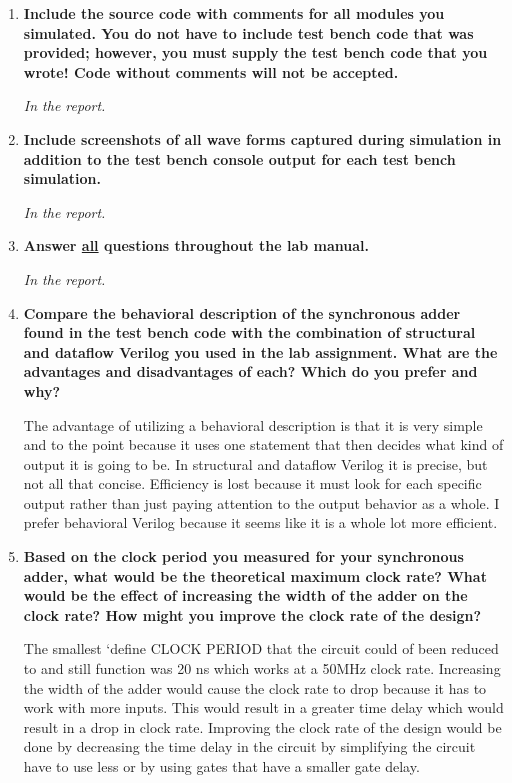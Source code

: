 \documentclass[a4paper,12pt]{article}
\begin{document}
\begin{enumerate}
  \item \textbf{Include the source code with comments for all modules you
    simulated. You do not have to include test bench code that was
    provided; however, you must supply the test bench code that you wrote! Code
    without comments will not be accepted.}

    \textit{In the report.}

  \item \textbf{Include screenshots of all wave forms captured during simulation in addition
    to the test bench console output for each test bench simulation.}

    \textit{In the report.}

  \item \textbf{Answer \underline{all} questions throughout the lab manual.}

    \textit{In the report.}

  \item \textbf{Compare the behavioral description of the synchronous adder found in the
    test bench code with the combination of structural and dataflow Verilog you
    used in the lab assignment. What are the advantages and disadvantages of each?
    Which do you prefer and why?}
    
    The advantage of utilizing a behavioral description is that it is very simple and to the point because
    it uses one statement that then decides what kind of output it is going to be. In structural and dataflow
    Verilog it is precise, but not all that concise. Efficiency is lost because it must look for each specific
    output rather than just paying attention to the output behavior as a whole. I prefer behavioral Verilog
    because it seems like it is a whole lot more efficient. 

  \item \textbf{Based on the clock period you measured for your synchronous adder, what
    would be the theoretical maximum clock rate? What would be the effect of
    increasing the width of the adder on the clock rate? How might you improve the
    clock rate of the design?}
    
    The smallest `define CLOCK PERIOD that the circuit could of been reduced to and still function
    was 20 ns which works at a 50MHz clock rate. Increasing the width of the adder would cause the
    clock rate to drop because it has to work with more inputs. This would result in a greater time
    delay which would result in a drop in clock rate. Improving the clock rate of the design would
    be done by decreasing the time delay in the circuit by simplifying the circuit have to use less
    or by using gates that have a smaller gate delay.

\end{enumerate}
\end{document}
